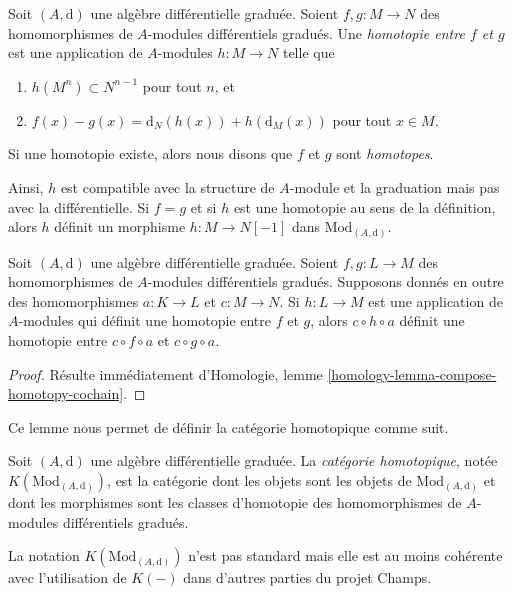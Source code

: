\begin{definition}
\label{definition-homotopy}
Soit $(A, \text{d})$ une algèbre différentielle graduée. Soient
$f, g : M \to N$ des homomorphismes de $A$-modules différentiels gradués. Une
{\it homotopie entre $f$ et $g$} est une application de $A$-modules $h : M \to N$
telle que
\begin{enumerate}
\item $h(M^n) \subset N^{n - 1}$ pour tout $n$, et
\item $f(x) - g(x) = \text{d}_N(h(x)) + h(\text{d}_M(x))$ pour
tout $x \in M$.
\end{enumerate}
Si une homotopie existe, alors nous disons que $f$ et $g$ sont {\it homotopes}.
\end{definition}

\noindent
Ainsi, $h$ est compatible avec la structure de $A$-module et la graduation
mais pas avec la différentielle. Si $f = g$ et si $h$ est une homotopie
au sens de la définition, alors $h$ définit un morphisme $h : M \to N[-1]$
dans $\text{Mod}_{(A, \text{d})}$.

\begin{lemma}
\label{lemma-compose-homotopy}
Soit $(A, \text{d})$ une algèbre différentielle graduée.
Soient $f, g : L \to M$ des homomorphismes de $A$-modules différentiels gradués.
Supposons donnés en outre des homomorphismes $a : K \to L$ et $c : M \to N$.
Si $h : L \to M$ est une application de $A$-modules qui définit une homotopie
entre $f$ et $g$, alors $c \circ h \circ a$ définit une homotopie
entre $c \circ f \circ a$ et $c \circ g \circ a$.
\end{lemma}

\begin{proof}
Résulte immédiatement d'Homologie, lemme \ref{homology-lemma-compose-homotopy-cochain}.
\end{proof}

\noindent
Ce lemme nous permet de définir la catégorie homotopique comme suit.

\begin{definition}
\label{definition-complexes-notation}
Soit $(A, \text{d})$ une algèbre différentielle graduée.
La {\it catégorie homotopique}, notée $K(\text{Mod}_{(A, \text{d})})$, est la
catégorie dont les objets sont les objets de
$\text{Mod}_{(A, \text{d})}$ et dont les morphismes sont les classes d'homotopie
des homomorphismes de $A$-modules différentiels gradués.
\end{definition}

\noindent
La notation $K(\text{Mod}_{(A, \text{d})})$ n'est pas standard mais elle est au
moins cohérente avec l'utilisation de $K(-)$ dans d'autres parties du projet Champs.

